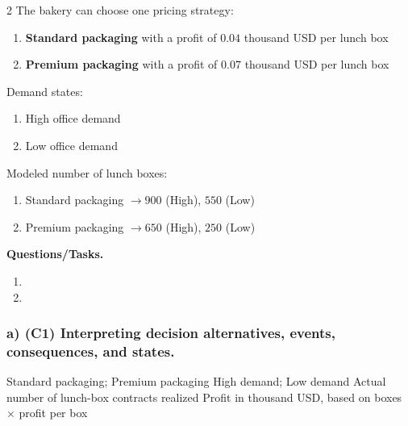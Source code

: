 	\begin{multicols}{2}
		The bakery can choose one pricing strategy:
		\begin{enumerate}[label=\arabic*.]
			\item \textbf{Standard packaging} with a profit of $0.04$ thousand USD per lunch box
			\item \textbf{Premium packaging} with a profit of $0.07$ thousand USD per lunch box
		\end{enumerate}
	
		Demand states:
		\begin{enumerate}[label=\arabic*.]
			\item High office demand
			\item Low office demand
		\end{enumerate}
	
			\columnbreak
	
		Modeled number of lunch boxes:
		\begin{enumerate}[label=\arabic*.]
			\item Standard packaging $\to 900$ (High), $550$ (Low)
			\item Premium packaging $\to 650$ (High), $250$ (Low)
		\end{enumerate}
	\end{multicols}

	\textbf{Questions/Tasks.}
	\begin{enumerate}[label=\textbf{\alph*)}]
		\item {}
		\item {}
	\end{enumerate}
	
	\subsubsection*{a) \textbf{(C1)} Interpreting decision alternatives, events, consequences, and states.}
	\label{subsec:problem4-community-bakery-lunch-boxes-c1}
	\DecisionElementsTable
	{Standard packaging; Premium packaging}
	{High demand; Low demand}
	{Actual number of lunch-box contracts realized}
	{Profit in thousand USD, based on boxes $\times$ profit per box}
	
	
